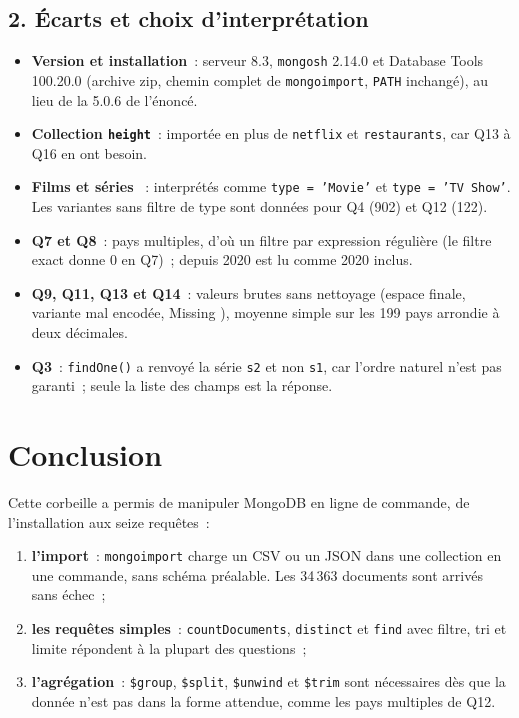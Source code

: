 \subsection*{2. Écarts et choix d'interprétation}
{}

\begin{itemize}[midpenalty=0, endpenalty=0]
	\item \textbf{Version et installation}~: serveur 8.3, \texttt{mongosh} 2.14.0 et Database Tools 100.20.0 (archive zip, chemin complet de \texttt{mongoimport}, \texttt{PATH} inchangé), au lieu de la 5.0.6 de l'énoncé.
	\item \textbf{Collection \texttt{height}}~: importée en plus de \texttt{netflix} et \texttt{restaurants}, car Q13 à Q16 en ont besoin.
	\item \textbf{\og Films \fg{} et \og séries \fg{}}~: interprétés comme \texttt{type = 'Movie'} et \texttt{type = 'TV Show'}. Les variantes sans filtre de type sont données pour Q4 (902) et Q12 (122).
	\item \textbf{Q7 et Q8}~: pays multiples, d'où un filtre par expression régulière (le filtre exact donne 0 en Q7)~; \og depuis 2020 \fg{} est lu comme 2020 inclus.
	\item \textbf{Q9, Q11, Q13 et Q14}~: valeurs brutes sans nettoyage (espace finale, variante mal encodée, \og Missing \fg), moyenne simple sur les 199 pays arrondie à deux décimales.
	\item \textbf{Q3}~: \texttt{findOne()} a renvoyé la série \texttt{s2} et non \texttt{s1}, car l'ordre naturel n'est pas garanti~; seule la liste des champs est la réponse.
\end{itemize}

\section*{Conclusion}
{}

\noindent Cette corbeille a permis de manipuler MongoDB en ligne de commande, de l'installation aux seize requêtes~:
\begin{enumerate}
	\item \textbf{l'import}~: \texttt{mongoimport} charge un CSV ou un JSON dans une collection en une commande, sans schéma préalable. Les 34\,363 documents sont arrivés sans échec~;
	\item \textbf{les requêtes simples}~: \texttt{countDocuments}, \texttt{distinct} et \texttt{find} avec filtre, tri et limite répondent à la plupart des questions~;
	\item \textbf{l'agrégation}~: \texttt{\$group}, \texttt{\$split}, \texttt{\$unwind} et \texttt{\$trim} sont nécessaires dès que la donnée n'est pas dans la forme attendue, comme les pays multiples de Q12.
\end{enumerate}

